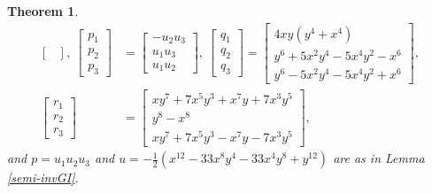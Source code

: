 \documentclass[a4paper,reqno]{amsart}
\newtheorem{theorem}{Theorem}[section]
\theoremstyle{definition}
\theoremstyle{remark} \newtheorem{remark}[theorem]{Remark}
\numberwithin{equation}{section}
\begin{document}
\begin{theorem}
\begin{align*}
\begin{bmatrix}
        \end{bmatrix}, \:
        \begin{bmatrix}
            p_1 \\
            p_2 \\
            p_3
        \end{bmatrix}
        &=
        \begin{bmatrix}
            -u_2u_3 \\
            u_1u_3 \\
            u_1u_2
        \end{bmatrix}, \:
        \begin{bmatrix}
            q_1 \\
            q_2 \\
            q_3
        \end{bmatrix}
        =
        \begin{bmatrix}
            4xy(y^4+x^4) \\
            y^6 + 5x^2y^4 - 5x^4y^2 - x^6 \\
            y^6 - 5x^2y^4 - 5x^4y^2 + x^6
        \end{bmatrix}, \\
        \begin{bmatrix}
            r_1 \\
            r_2 \\
            r_3
        \end{bmatrix}
        &=
        \begin{bmatrix}
            xy^7 + 7x^5y^3 + x^7y + 7x^3y^5 \\
            y^8 - x^8 \\
            xy^7 + 7x^5y^3 - x^7y - 7x^3y^5
        \end{bmatrix},
    \end{align*}
    \fi
    and \(p = u_1u_2u_3\) and \(u = -\frac{1}{2}(x^{12} - 33x^8y^4 - 33x^4y^8 + y^{12})\) are as in Lemma \ref{semi-invGI}.
\end{theorem}
\end{document}
